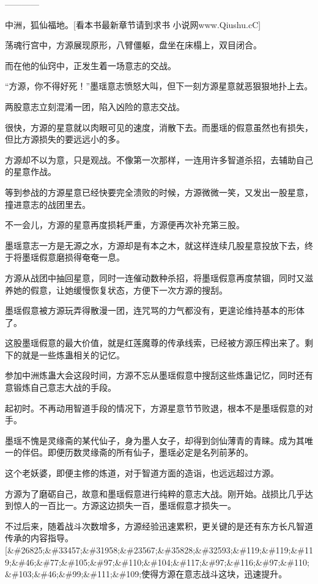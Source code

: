 
\begin{this_body}

------------

中洲，狐仙福地。[看本书最新章节请到求书 小说网www.Qiushu.cC]

荡魂行宫中，方源展现原形，八臂僵躯，盘坐在床榻上，双目闭合。

而在他的仙窍中，正发生着一场意志的交战。

“方源，你不得好死！”墨瑶意志愤怒大叫，但下一刻方源星意就恶狠狠地扑上去。

两股意志立刻混淆一团，陷入凶险的意志交战。

很快，方源的星意就以肉眼可见的速度，消散下去。而墨瑶的假意虽然也有损失，但比方源损失的要远远小的多。

方源却不以为意，只是观战。不像第一次那样，一连用许多智道杀招，去辅助自己的星意作战。

等到参战的方源星意已经快要完全溃败的时候，方源微微一笑，又发出一股星意，撞进意志的战团里去。

不一会儿，方源的星意再度损耗严重，方源便再次补充第三股。

墨瑶意志一方是无源之水，方源却是有本之木，就这样连续几股星意投放下去，终于将墨瑶假意磨损得奄奄一息。

方源从战团中抽回星意，同时一连催动数种杀招，将墨瑶假意再度禁锢，同时又滋养她的假意，让她缓慢恢复状态，方便下一次方源的搜刮。

墨瑶假意被方源玩弄得散漫一团，连咒骂的力气都没有，更遑论维持基本的形体了。

这股墨瑶假意的最大价值，就是红莲魔尊的传承线索，已经被方源压榨出来了。剩下的就是一些炼蛊相关的记忆。

参加中洲炼蛊大会这段时间，方源不忘从墨瑶假意中搜刮这些炼蛊记忆，同时还有意锻炼自己意志大战的手段。

起初时。不再动用智道手段的情况下，方源星意节节败退，根本不是墨瑶假意的对手。

墨瑶不愧是灵缘斋的某代仙子，身为墨人女子，却得到剑仙薄青的青睐。成为其唯一的伴侣。即便历数灵缘斋的所有仙子，墨瑶必定是名列前茅的。

这个老妖婆，即便主修的炼道，对于智道方面的造诣，也远远超过方源。

方源为了磨砺自己，故意和墨瑶假意进行纯粹的意志大战。刚开始。战损比几乎达到惊人的一百比一。方源这边损失一百，墨瑶假意才损失一。

不过后来，随着战斗次数增多，方源经验迅速累积，更关键的是还有东方长凡智道传承的内容指导。[\&\#26825;\&\#33457;\&\#31958;\&\#23567;\&\#35828;\&\#32593;\&\#119;\&\#119;\&\#119;\&\#46;\&\#77;\&\#105;\&\#97;\&\#110;\&\#104;\&\#117;\&\#97;\&\#116;\&\#97;\&\#110;\&\#103;\&\#46;\&\#99;\&\#111;\&\#109;使得方源在意志战斗这块，迅速提升。


\end{this_body}
